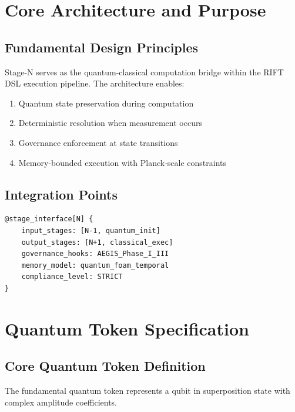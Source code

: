 \documentclass[12pt,a4paper]{article}
\begin{document}
\section{Core Architecture and Purpose}

\subsection{Fundamental Design Principles}

Stage-N serves as the quantum-classical computation bridge within the RIFT DSL execution pipeline. The architecture enables:

\begin{enumerate}
    \item \textcolor{quantumblue}{Quantum state preservation} during computation
    \item \textcolor{classicalgreen}{Deterministic resolution} when measurement occurs
    \item \textcolor{governancered}{Governance enforcement} at state transitions
    \item \textcolor{memoryorange}{Memory-bounded execution} with Planck-scale constraints
\end{enumerate}

\subsection{Integration Points}

\begin{lstlisting}[style=riftlang,caption={Stage-N Integration Architecture}]
@stage_interface[N] {
    input_stages: [N-1, quantum_init]
    output_stages: [N+1, classical_exec]
    governance_hooks: AEGIS_Phase_I_III
    memory_model: quantum_foam_temporal
    compliance_level: STRICT
}
\end{lstlisting}

\section{Quantum Token Specification}

\subsection{Core Quantum Token Definition}

The fundamental quantum token represents a qubit in superposition state with complex amplitude coefficients.
\end{document}
